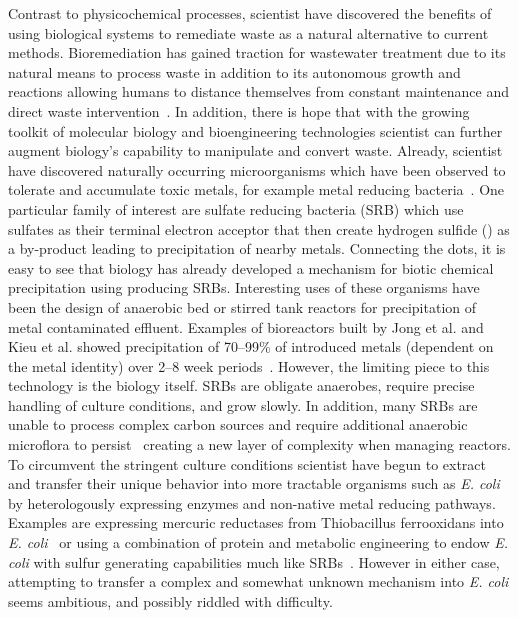 \documentclass[../main/main]{subfiles}
\begin{document}
Contrast to physicochemical processes, scientist have discovered the benefits of using biological systems to remediate waste as a natural alternative to current methods. Bioremediation has gained traction for wastewater treatment due to its natural means to process waste in addition to its autonomous growth and reactions allowing humans to distance themselves from constant maintenance and direct waste intervention~\cite{gavrilescu2015,singh2015}. In addition, there is hope that with the growing toolkit of molecular biology and bioengineering technologies scientist can further augment biology's capability to manipulate and convert waste.
Already, scientist have discovered naturally occurring microorganisms which have been observed to tolerate and accumulate toxic metals, for example metal reducing bacteria~\cite{gadd2004microbial,wiatrowski2006novel,silver2005,picard2018,gartman2017}. One particular family of interest are sulfate reducing bacteria (SRB) which use sulfates as their terminal electron acceptor that then create hydrogen sulfide (\HS{}) as a by-product leading to precipitation of nearby metals.
Connecting the dots, it is easy to see that biology has already developed a mechanism for biotic chemical precipitation using \HS{} producing SRBs. Interesting uses of these organisms have been the design of anaerobic bed or stirred tank reactors for precipitation of metal contaminated effluent. Examples of bioreactors built by Jong et al. and Kieu et al. showed precipitation of 70--99\% of introduced metals (dependent on the metal identity) over 2--8 week periods~\cite{jong2003,kieu2011}. However, the limiting piece to this technology is the biology itself. SRBs are obligate anaerobes, require precise handling of culture conditions, and grow slowly. In addition, many SRBs are unable to process complex carbon sources and require additional anaerobic microflora to persist~\cite{neculita2007} creating a new layer of complexity when managing reactors. To circumvent the stringent culture conditions scientist have begun to extract and transfer their unique behavior into more tractable organisms such as \textit{E. coli} by heterologously expressing enzymes and non-native metal reducing pathways. Examples are expressing mercuric reductases from Thiobacillus ferrooxidans into \textit{E. coli}~\cite{shiratori1989} or using a combination of protein and metabolic engineering to endow \textit{E. coli} with sulfur generating capabilities much like SRBs~\cite{wang2000}. However in either case, attempting to transfer a complex and somewhat unknown mechanism into \textit{E. coli}
seems ambitious, and possibly riddled with difficulty.
\end{document}
